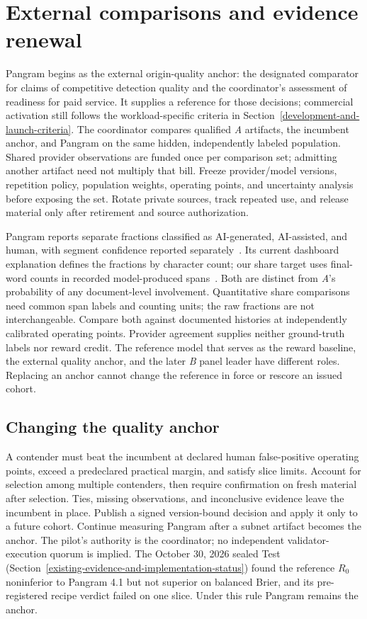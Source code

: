 \section{External comparisons and evidence renewal}\label{pangram-evidence-and-assigned-audits}

Pangram begins as the external origin-quality anchor: the designated comparator
for claims of competitive detection quality and the coordinator's assessment
of readiness for paid service. It supplies a reference for those decisions;
commercial activation still follows the workload-specific criteria in
Section~\ref{development-and-launch-criteria}. The coordinator compares
qualified \textit{A} artifacts, the incumbent anchor, and Pangram on the same
hidden, independently labeled population. Shared provider observations are
funded once per comparison set; admitting another artifact need not
multiply that bill. Freeze provider/model versions, repetition policy, population
weights, operating points, and uncertainty analysis before exposing the set.
Rotate private sources, track repeated use, and release material only after
retirement and source authorization.

Pangram reports separate fractions classified as AI-generated, AI-assisted,
and human, with segment confidence reported separately~\cite{pangramapi,pangramcard}.
Its current dashboard explanation defines the fractions by character count;
our share target uses final-word counts in recorded model-produced spans~\cite{pangramscores}.
Both are distinct from \textit{A}'s probability of any document-level involvement.
Quantitative share comparisons need common span labels and counting units;
the raw fractions are not interchangeable.
Compare both against documented histories at independently calibrated operating
points. Provider agreement supplies neither ground-truth labels nor reward
credit. The reference model that serves as the reward baseline, the
external quality anchor, and the later \textit{B} panel leader have different
roles. Replacing an anchor cannot change the reference in force or rescore an
issued cohort.

\subsection{Changing the quality anchor}\label{pangram-cadence-and-parity}

A contender must beat the incumbent at declared human false-positive operating
points, exceed a predeclared practical margin, and satisfy slice limits. Account
for selection among multiple contenders, then require confirmation on fresh
material after selection. Ties, missing observations, and inconclusive evidence
leave the incumbent in place. Publish a signed version-bound decision and apply
it only to a future cohort. Continue measuring Pangram after a subnet artifact
becomes the anchor. The pilot's authority is the coordinator; no independent
validator-execution quorum is implied. The October 30, 2026 sealed Test
(Section~\ref{existing-evidence-and-implementation-status}) found the
reference \(R_0\) noninferior to Pangram 4.1 but not superior on balanced Brier, and its
pre-registered recipe verdict failed on one slice. Under this rule Pangram
remains the anchor.

